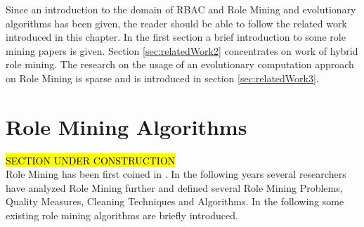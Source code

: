 Since an introduction to the domain of RBAC and Role Mining and evolutionary algorithms has been given, the reader should be able to follow the related work introduced in this chapter. In the first section a brief introduction to some role mining papers is given. Section \ref{sec:relatedWork2} concentrates on work of hybrid role mining. The research on the usage of an evolutionary computation approach on Role Mining is sparse and is introduced in section \ref{sec:relatedWork3}. 

\section{Role Mining Algorithms}
\hl{SECTION UNDER CONSTRUCTION}\\
Role Mining has been first coined in \cite{Kuhlmann}. In the following years several researchers have analyzed Role Mining further and defined several Role Mining Problems, Quality Measures, Cleaning Techniques and Algorithms. In the following some existing role mining algorithms are briefly introduced.\\
